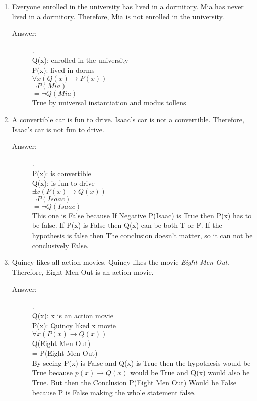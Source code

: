 \documentclass[12pt, oneside]{article}
\begin{document}
\begin{enumerate}
\begin{enumerate}
    \item Everyone enrolled in the university has lived in a dormitory. Mia has never lived in a dormitory. Therefore, Mia is not enrolled in the university.
    \begin{description}
        \item[Answer:] .\\
        Q(x): enrolled in the university\\
        P(x): lived in dorms\\
        $\forall x (Q(x) \rightarrow P(x))$\\
        $\lnot P(Mia)$\\
        $= \lnot Q(Mia)$\\
        True by universal instantiation and modus tollens
    \end{description}
    \item A convertible car is fun to drive. Isaac’s car is not a convertible. Therefore, Isaac’s car is not fun to drive.
    \begin{description}
        \item[Answer:] .\\
        P(x): is convertible\\
        Q(x): is fun to drive\\
        $\exists x(P(x) \rightarrow Q(x))$\\
        $\lnot P(Isaac)$\\
        $= \lnot Q(Isaac)$\\
        This one is False because If Negative P(Isaac) is True then P(x) has to be false.
        If P(x) is False then Q(x) can be both T or F. If the hypothesis is false then The conclusion doesn’t matter, so it can not be conclusively False.
    \end{description}
    \item Quincy likes all action movies. Quincy likes the movie {\it Eight Men Out}. Therefore, Eight Men Out is an action movie.
    \begin{description}
        \item[Answer:] .\\
        Q(x): x is an action movie\\
        P(x): Quincy liked x movie\\
        $\forall x (P(x) \rightarrow Q(x))$\\
        Q(Eight Men Out)\\
        = P(Eight Men Out)\\
        By seeing P(x) is False and Q(x) is True then the hypothesis would be True because $p(x) \rightarrow Q(x)$ would be True and Q(x) would also be True. But then the Conclusion P(Eight Men Out) Would be False because P is False making the whole statement false.
    \end{description}
\end{enumerate}


\end{enumerate}
\end{document}
